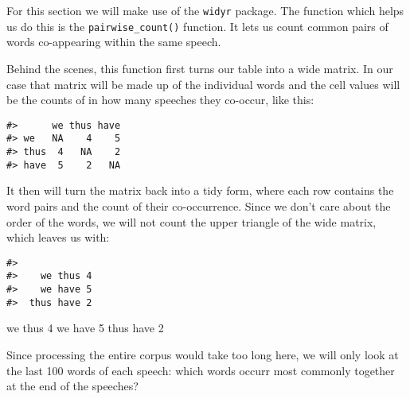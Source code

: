 \documentclass[]{book}
\newenvironment{Shaded}{\begin{snugshade}}{\end{snugshade}}
\newcommand{\CommentTok}[1]{\textcolor[rgb]{0.56,0.35,0.01}{\textit{#1}}}
\newcommand{\DataTypeTok}[1]{\textcolor[rgb]{0.13,0.29,0.53}{#1}}
\newcommand{\DecValTok}[1]{\textcolor[rgb]{0.00,0.00,0.81}{#1}}
\newcommand{\KeywordTok}[1]{\textcolor[rgb]{0.13,0.29,0.53}{\textbf{#1}}}
\newcommand{\NormalTok}[1]{#1}
\newcommand{\OperatorTok}[1]{\textcolor[rgb]{0.81,0.36,0.00}{\textbf{#1}}}
\newcommand{\OtherTok}[1]{\textcolor[rgb]{0.56,0.35,0.01}{#1}}
\newcommand{\StringTok}[1]{\textcolor[rgb]{0.31,0.60,0.02}{#1}}
\begin{document}
For this section we will make use of the \texttt{widyr} package. The function which helps us do this is the \texttt{pairwise\_count()} function. It lets us count common pairs of words co-appearing within the same speech.

Behind the scenes, this function first turns our table into a wide matrix. In our case that matrix will be made up of the individual words and the cell values will be the counts of in how many speeches they co-occur, like this:

\begin{verbatim}
#>      we thus have
#> we   NA    4    5
#> thus  4   NA    2
#> have  5    2   NA
\end{verbatim}

It then will turn the matrix back into a tidy form, where each row contains the word pairs and the count of their co-occurrence. Since we don't care about the order of the words, we will not count the upper triangle of the wide matrix, which leaves us with:

\begin{verbatim}
#>             
#>    we thus 4
#>    we have 5
#>  thus have 2
\end{verbatim}

we \textbar{} thus \textbar{} 4
we \textbar{} have \textbar{} 5
thus \textbar{} have \textbar{} 2

Since processing the entire corpus would take too long here, we will only look at the last 100 words of each speech: which words occurr most commonly together at the end of the speeches?

\begin{Shaded}
\end{Shaded}
\end{document}
